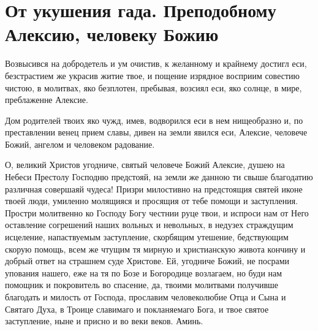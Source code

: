 \mychapterending


 

\section{От укушения гада.  Преподобному Алексию, человеку Божию}\begin{mymulticols}
 


Возвысився на добродетель и ум очистив, к желанному и крайнему достигл еси, безстрастием же украсив житие твое, и пощение изрядное восприим совестию чистою, в молитвах, яко безплотен, пребывая, возсиял еси, яко солнце, в мире, преблаженне Алексие.


Дом родителей твоих яко чужд, имев, водворился еси в нем нищеобразно и, по преставлении венец прием славы, дивен на земли явился еси, Алексие, человече Божий, ангелом и человеком радование.


О, великий Христов угодниче, святый человече Божий Алексие, душею на Небеси Престолу Господню предстояй, на земли же данною ти свыше благодатию различная совершаяй чудеса! Призри милостивно на предстоящия святей иконе твоей люди, умиленно молящияся и просящия от тебе помощи и заступления. Простри молитвенно ко Господу Богу честнии руце твои, и испроси нам от Него оставление согрешений наших вольных и невольных, в недузех страждущим исцеление, напаствуемым заступление, скорбящим утешение, бедствующим скорую помощь, всем же чтущим тя мирную и христианскую живота кончину и добрый ответ на страшнем суде Христове. Ей, угодниче Божий, не посрами упования нашего, еже на тя по Бозе и Богородице возлагаем, но буди нам помощник и покровитель во спасение, да, твоими молитвами получивше благодать и милость от Господа, прославим человеколюбие Отца и Сына и Святаго Духа, в Троице славимаго и покланяемаго Бога, и твое святое заступление, ныне и присно и во веки веков. Аминь.

\end{mymulticols}

\mychapterending


